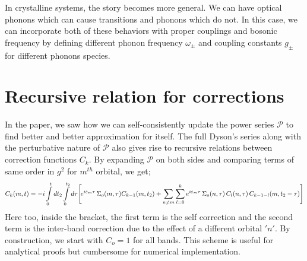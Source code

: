 \documentclass{article}
\begin{document}
In crystalline systems, the story becomes more general. We can have optical phonons which can cause transitions and phonons which do not. In this case, we can incorporate both of these behaviors with proper couplings and bosonic frequency by defining different phonon frequency $\omega_\pm$ and coupling constants $g_\pm$ for different phonons species. 
\section{Recursive relation for corrections}

In the paper, we saw how we can self-consistently update the power series $\mathcal{P}$ to find better and better approximation for itself. The full Dyson's series along with the perturbative nature of $\mathcal{P}$ also gives rise to recursive relations between correction functions $C_k$. By expanding $\mathcal{P}$ on both sides and comparing terms of same order in $g^2$ for $m^{th}$ orbital, we get;
\begin{equation}
    \begin{aligned}
    &C_{k}(m,t) = -i\int\displaylimits_{0}^{t}dt_2 \int\displaylimits_{0}^{t_2}d\tau \Bigg[\!e^{i\varepsilon_m\tau}\, \Sigma_o(m,\tau)C_{k-1}(m,t_2) +\sum_{n\neq m}\sum_{l=0}^{k}  e^{i\varepsilon_{m}\tau}\,\Sigma_o(n,\tau)\,C_{l}(n,\tau)\,C_{k-1-l}(m,t_2-\tau)\Bigg]\\
    \end{aligned}
    \label{recursive equation}
\end{equation}
Here too, inside the bracket, the first term is the self correction and the second term is the inter-band correction due to the effect of a different orbital $'n'$. By construction, we start with $C_o = 1$ for all bands. This scheme is useful for analytical proofs but cumbersome for numerical implementation. 

\end{document}
